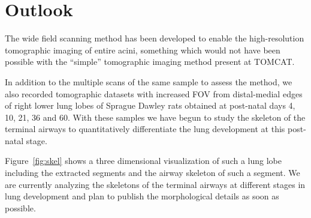 \section{Outlook}
The wide field scanning method has been developed to enable the high-resolution tomographic imaging of entire acini, something which would not have been possible with the  ``simple'' tomographic imaging method present at TOMCAT.

In addition to the multiple scans of the same sample to assess the method, we also recorded tomographic datasets with increased FOV from distal-medial edges of right lower lung lobes of Sprague Dawley rats obtained at post-natal days 4, 10, 21, 36 and 60. With these samples we have begun to study the skeleton of the terminal airways to quantitatively differentiate the lung development at this post-natal stage.

Figure~\ref{fig:skel} shows a three dimensional visualization of such a lung lobe including the extracted segments and the airway skeleton of such a segment. We are currently analyzing the skeletons of the terminal airways at different stages in lung development and plan to publish the morphological details as soon as possible.

